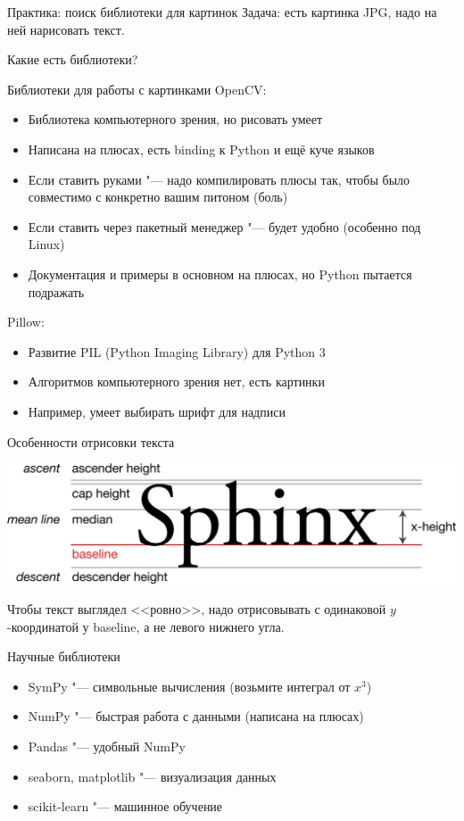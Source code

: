 \begin{frame}[t]{Практика: поиск библиотеки для картинок}
	Задача: есть картинка JPG, надо на ней нарисовать текст.
	
	Какие есть библиотеки?
\end{frame}

\begin{frame}[t]{Библиотеки для работы с картинками}
	OpenCV:
	\begin{itemize}
	\item Библиотека компьютерного зрения, но рисовать умеет
	\item Написана на плюсах, есть binding к Python и ещё куче языков
	\item Если ставить руками "--- надо компилировать плюсы так,
		чтобы было совместимо с конкретно вашим питоном (боль)
	\item Если ставить через пакетный менеджер "--- будет удобно
		(особенно под Linux)
	\item Документация и примеры в основном на плюсах, но Python пытается подражать
	\end{itemize}
	
	Pillow:
	\begin{itemize}
	\item Развитие PIL (Python Imaging Library) для Python 3
	\item Алгоритмов компьютерного зрения нет, есть картинки
	\item Например, умеет выбирать шрифт для надписи
	\end{itemize}
\end{frame}

\begin{frame}{Особенности отрисовки текста}
	\begin{center}
		\includegraphics[width=\linewidth,keepaspectratio]{typography.png}
	\end{center}
	
	Чтобы текст выглядел <<ровно>>, надо отрисовывать с одинаковой
	$y$-координатой у baseline, а не левого нижнего угла.
\end{frame}

\begin{frame}[t]{Научные библиотеки}
	\begin{itemize}
	\item SymPy "--- символьные вычисления (возьмите интеграл от $x^3$)
	\item NumPy "--- быстрая работа с данными (написана на плюсах)
	\item Pandas "--- удобный NumPy
	\item seaborn, matplotlib "--- визуализация данных
	\item scikit-learn "--- машинное обучение
	\end{itemize}
\end{frame}
